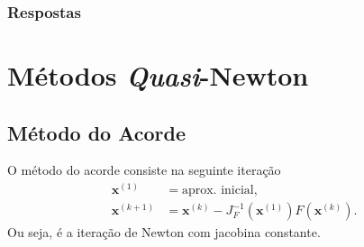 \ifisbook
\subsubsection{Respostas}
\shipoutAnswer
\fi


\section{Métodos \textit{Quasi}-Newton}\label{cap_snl_sec_quasi_newton}
\badgeRevisar

\subsection{Método do Acorde}
\badgeRevisar

O método do acorde consiste na seguinte iteração
\begin{align}
  \pmb{x}^{(1)} &= \text{aprox. inicial},\\
  \pmb{x}^{(k+1)} &= \pmb{x}^{(k)} - J_F^{-1}(\pmb{x}^{(1)})F(\pmb{x}^{(k)}).
\end{align}
Ou seja, é a iteração de Newton com jacobina constante.

